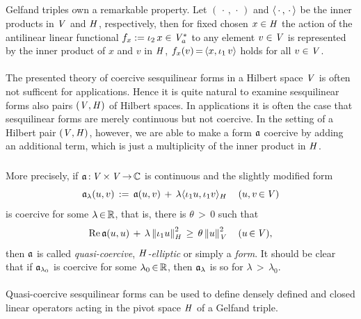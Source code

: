 \documentclass[11pt,twoside]{article}
\begin{document}
\subparagraph{}
Gelfand triples own a remarkable property.
Let $(\,\cdot\,,\,\cdot\,)$ and $\langle \,\cdot\,,\,\cdot\, \rangle$
be the inner products in $\mathit{V}$ and $\mathit{H}$,
respectively,
then for fixed chosen $x \in \mathit{H}$
the action of the antilinear linear functional
$f_x := \iota_2 \, x \in \mathit{V}_a^*$ to any element $v \in \mathit{V}$
is represented by the inner product of $x$ and $v$ in $\mathit{H}$,
{\ie} $f_x(v) {\,=\,} \langle x,\iota_1 \, v \rangle$ holds for all $v \in \mathit{V}$.

\paragraph{} %
The presented theory of coercive sesquilinear forms in a Hilbert space $\mathit{V}$
is often not sufficent for applications.
Hence it is quite natural to examine sesquilinear forms
also {\wrt} pairs $(\mathit{V},\mathit{H})$ of Hilbert spaces.
In applications it is often the case
that sesquilinear forms are merely continuous but not coercive.
In the setting of a Hilbert pair $(\mathit{V},\mathit{H})$,
however,
we are able to make a form $\mathfrak{a}$ coercive
by adding an additional term,
which is just a multiplicity of the inner product in $\mathit{H}$.

\subparagraph{}
More precisely,
if $\mathfrak{a} {\,:\,} \mathit{V} {\,\times\,} \mathit{V} {\,\to\,} {\mathbb{C}}$ is continuous
and the slightly modified form
\[
\mathfrak{a}_{\lambda}(u,v) \,:=\,
\mathfrak{a}(u,v) \,+\, \lambda \langle \iota_1 u,\iota_1 v \rangle_H \, \quad
(u,v {\,\in\,} \mathit{V})
\]
is coercive for some $\lambda {\,\in\,} {\mathbb{R}}$,
that is,
there is $\theta {\,>\,} 0$ such that
\[
\operatorname{Re} \mathfrak{a}(u,u)  \,+\,
\lambda \left\lVert \iota_1u \right\rVert_{\mathit{H}}^2 \, \geq \, \theta \left\lVert u \right\rVert_{\mathit{V}}^2
\quad (u {\,\in\,} \mathit{V}),
\]
then $\mathfrak{a}$ is called
\textit{quasi-coercive},
\textit{$\mathit{H}$-elliptic}
or simply a \textit{\GARDING} \textit{form}.
It should be clear that
if $\mathfrak{a}_{\lambda_0}$ is coercive for some $\lambda_0 {\,\in\,} {\mathbb{R}}$,
then $\mathfrak{a}_{\lambda}$ is so for $\lambda {\,>\,} \lambda_0$.

\paragraph{} %
Quasi-coercive sesquilinear forms can be used
to define densely defined and closed linear operators
acting in the pivot space $\mathit{H}$ of a Gelfand triple.
\end{document}
